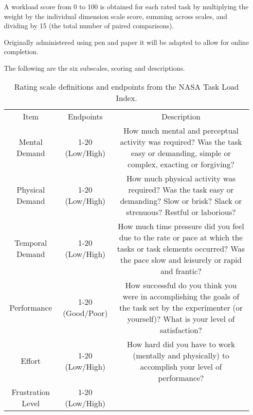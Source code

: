 \documentclass[man]{apa7}
\begin{document}
A  workload  score  from  0  to  100  is  obtained  for  each  rated task  by  multiplying  the  weight  by  the  individual  dimension  scale  score, summing  across  scales,  and  dividing  by  15  (the  total  number  of  paired comparisons).

Originally administered using pen and paper it will be adapted to allow for online completion.

The following are the six subscales, scoring and descriptions.

\begin{table}
    \centering
    \begin{tabular}{ccc}
         Item               & Endpoints         & Description \\
         Mental Demand      &  1-20 (Low/High)  & How much mental and perceptual activity was required? Was the task easy or demanding, simple or complex, exacting or forgiving?\\
         Physical Demand    &  1-20 (Low/High)  & How much physical activity was required? Was the task easy or demanding? Slow or brisk? Slack or strenuous? Restful or laborious? \\
         Temporal Demand    &  1-20 (Low/High)  & How much time pressure did you feel due to the rate or pace at which the tasks or task elements occurred? Was the pace slow and leisurely or rapid and frantic? \\
         Performance        &  1-20 (Good/Poor) & How successful do you think you were in accomplishing the goals of the task set by the experimenter (or yourself)? What is your level of satisfaction? \\
         Effort             &  1-20 (Low/High)  & How hard did you have to work (mentally and physically) to accomplish your level of performance? \\
         Frustration Level  &  1-20 (Low/High)  & \\
    \end{tabular}
    \caption{Rating scale definitions and endpoints from the NASA Task Load Index.}
    \label{tab:tlx}
\end{table}
\end{document}
